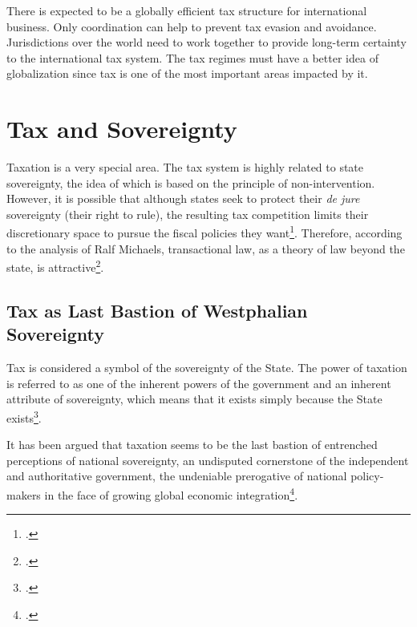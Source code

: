There is expected to be a globally efficient tax structure for international business. Only coordination can help to prevent tax evasion and avoidance. Jurisdictions over the world need to work together to provide long-term certainty to the international tax system. The tax regimes must have a better idea of globalization since tax is one of the most important areas impacted by it. 


\section{Tax and Sovereignty}
Taxation is a very special area. The tax system is highly related to state sovereignty, the idea of which is based on the principle of non-intervention. However, it is possible that although states seek to protect their \textit{de jure} sovereignty (their right to rule), the resulting tax competition limits their discretionary space to pursue the fiscal policies they want\footcite[216]{Dietsch2016}.
Therefore, according to the analysis of Ralf Michaels, transactional law, as a theory of law beyond the state, is attractive\footcite[300]{Michaels2013}.

\subsection{Tax as Last Bastion of Westphalian Sovereignty}

Tax is considered a symbol of the sovereignty of the State. The power of taxation is referred to as one of the inherent powers of the government and an inherent attribute of sovereignty, which means that it exists simply because the State exists\footcite{Mabel2022}. 



It has been argued that taxation seems to be the last bastion of entrenched perceptions of national sovereignty, an undisputed cornerstone of the independent and authoritative government, the undeniable prerogative of national policy-makers in the face of growing global economic integration\footcite{Christensen2016}. 

